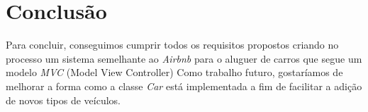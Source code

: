 \documentclass[a4paper]{report}
\begin{document}
\chapter{Conclusão}

Para concluir, conseguimos cumprir todos os requisitos propostos criando no processo um
sistema semelhante ao \textit{Airbnb} para o aluguer de carros que segue um modelo \textit{MVC} (Model View Controller)
Como trabalho futuro, gostaríamos de melhorar a forma como a classe \textit{Car} está implementada a fim
de facilitar a adição de novos tipos de veículos. 
\end{document}
